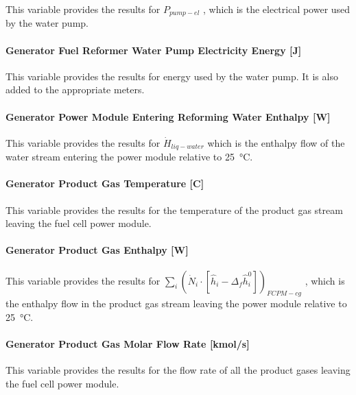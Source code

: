 This variable provides the results for \({P_{pump - el}}\) , which is the electrical power used by the water pump.

\paragraph{Generator Fuel Reformer Water Pump Electricity Energy {[}J{]}}\label{generator-fuel-reformer-water-pump-electric-energy-j}

This variable provides the results for energy used by the water pump. It is also added to the appropriate meters.

\paragraph{Generator Power Module Entering Reforming Water Enthalpy {[}W{]}}\label{generator-power-module-entering-reforming-water-enthalpy-w}

This variable provides the results for \({\dot H_{liq - water}}\) which is the enthalpy flow of the water stream entering the power module relative to \SI{25}{\celsius}.

\paragraph{Generator Product Gas Temperature {[}C{]}}\label{generator-product-gas-temperature-c}

This variable provides the results for the temperature of the product gas stream leaving the fuel cell power module.

\paragraph{Generator Product Gas Enthalpy {[}W{]}}\label{generator-product-gas-enthalpy-w}

This variable provides the results for \({\sum\limits_i {\left( {{{\dot N}_i} \cdot \left[ {{{\hat h}_i} - {\Delta_f}\hat h_i^0} \right]} \right)}_{FCPM - cg}}\) , which is the enthalpy flow in the product gas stream leaving the power module relative to \SI{25}{\celsius}.

\paragraph{Generator Product Gas Molar Flow Rate {[}kmol/s{]}}\label{generator-product-gas-molar-flow-rate-kmols}

This variable provides the results for the flow rate of all the product gases leaving the fuel cell power module.

